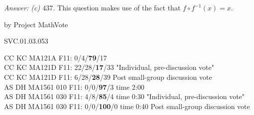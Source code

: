 
{\it Answer: (c) $437$.}  This question makes use of the fact that $f\circ f^{-1}(x)=x$.

\medskip
by Project MathVote

SVC.01.03.053

CC KC MA121A F11: 0/4/{\bf79}/17  \\
CC KC MA121D F11: 22/28/{\bf17}/33 "Individual, pre-discussion vote" \\
CC KC MA121D F11: 6/28/{\bf28}/39 Post small-group discussion vote \\
AS DH MA1561 010 F11: 0/0/{\bf97}/3 time 2:00  \\
AS DH MA1561 030 F11: 4/8/{\bf85}/4 time 0:30 "Individual, pre-discussion vote" \\
AS DH MA1561 030 F11: 0/0/{\bf100}/0 time 0:40 Post small-group discussion vote \\
